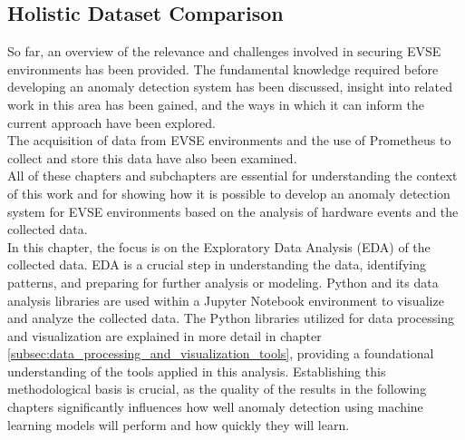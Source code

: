 \subsection{Holistic Dataset Comparison}
So far, an overview of the relevance and challenges involved in securing EVSE environments has been provided. The fundamental knowledge required before developing an anomaly detection system has been discussed, insight into related work in this area has been gained, and the ways in which it can inform the current approach have been explored.\\
The acquisition of data from EVSE environments and the use of Prometheus to collect and store this data have also been examined.\\

All of these chapters and subchapters are essential for understanding the context of this work and for showing how it is possible to develop an anomaly detection system for EVSE environments based on the analysis of hardware events and the collected data.\\
In this chapter, the focus is on the Exploratory Data Analysis (EDA) of the collected data. EDA is a crucial step in understanding the data, identifying patterns, and preparing for further analysis or modeling. Python and its data analysis libraries are used within a Jupyter Notebook environment to visualize and analyze the collected data. The Python libraries utilized for data processing and visualization are explained in more detail in chapter \ref{subsec:data_processing_and_visualization_tools}, providing a foundational understanding of the tools applied in this analysis. Establishing this methodological basis is crucial, as the quality of the results in the following chapters significantly influences how well anomaly detection using machine learning models will perform and how quickly they will learn.\\

